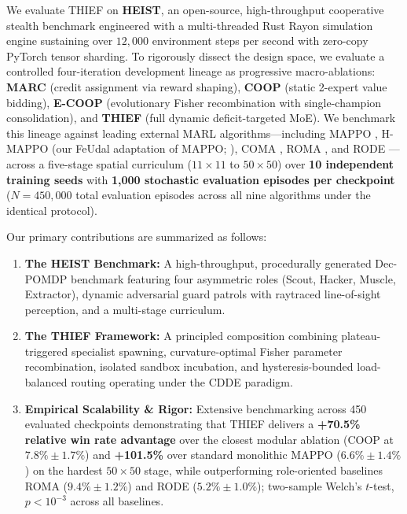 We evaluate THIEF on \textbf{HEIST}, an open-source, high-throughput cooperative stealth benchmark engineered with a multi-threaded Rust Rayon simulation engine sustaining over $12,\!000$ environment steps per second with zero-copy PyTorch tensor sharding. To rigorously dissect the design space, we evaluate a controlled four-iteration development lineage as progressive macro-ablations: \textbf{MARC} (credit assignment via reward shaping), \textbf{COOP} (static 2-expert value bidding), \textbf{E-COOP} (evolutionary Fisher recombination with single-champion consolidation), and \textbf{THIEF} (full dynamic deficit-targeted MoE). We benchmark this lineage against leading external MARL algorithms---including MAPPO \citep{yu2022surprising}, H-MAPPO (our FeUdal adaptation of MAPPO; \citealp{vezhnevets2017feudal,yu2022surprising}), COMA \citep{foerster2018counterfactual}, ROMA \citep{wang2020roma}, and RODE \citep{wang2021rode}---across a five-stage spatial curriculum ($11 \times 11$ to $50 \times 50$) over \textbf{10 independent training seeds} with \textbf{1,000 stochastic evaluation episodes per checkpoint} ($N=450,\!000$ total evaluation episodes across all nine algorithms under the identical protocol).

Our primary contributions are summarized as follows:
\begin{enumerate}[leftmargin=*,nosep]
    \item \textbf{The HEIST Benchmark:} A high-throughput, procedurally generated Dec-POMDP benchmark featuring four asymmetric roles (Scout, Hacker, Muscle, Extractor), dynamic adversarial guard patrols with raytraced line-of-sight perception, and a multi-stage curriculum.
    \item \textbf{The THIEF Framework:} A principled composition combining plateau-triggered specialist spawning, curvature-optimal Fisher parameter recombination, isolated sandbox incubation, and hysteresis-bounded load-balanced routing operating under the CDDE paradigm.
    \item \textbf{Empirical Scalability \& Rigor:} Extensive benchmarking across 450 evaluated checkpoints demonstrating that THIEF delivers a \textbf{+70.5\% relative win rate advantage} over the closest modular ablation (COOP at $7.8\% \pm 1.7\%$) and \textbf{+101.5\%} over standard monolithic MAPPO ($6.6\% \pm 1.4\%$) on the hardest $50 \times 50$ stage, while outperforming role-oriented baselines ROMA ($9.4\% \pm 1.2\%$) and RODE ($5.2\% \pm 1.0\%$); two-sample Welch's $t$-test, $p < 10^{-3}$ across all baselines.
\end{enumerate}
